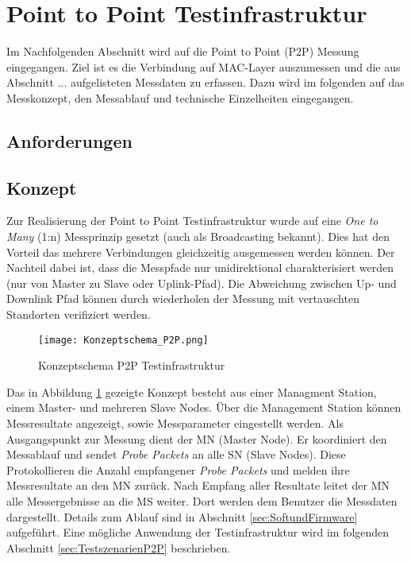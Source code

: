 \clearpage
\section{Point to Point Testinfrastruktur}\label{sec:PointtoPointTestinfrastruktur}

Im Nachfolgenden Abschnitt wird auf die Point to Point (P2P) Messung eingegangen. Ziel ist es die Verbindung auf MAC-Layer auszumessen und die aus Abschnitt ... aufgelisteten Messdaten zu erfassen. Dazu wird im folgenden auf das Messkonzept, den Messablauf und technische Einzelheiten eingegangen. 

\subsection{Anforderungen}\label{sec:AnforderungentP2P}


\subsection{Konzept}\label{sec:KonzeptP2P}

Zur Realisierung der Point to Point Testinfrastruktur wurde auf eine \textit{One to Many} (1:n) Messprinzip gesetzt (auch als Broadcasting bekannt). Dies hat den Vorteil das mehrere Verbindungen gleichzeitig ausgemessen werden können. Der Nachteil dabei ist, dass die Messpfade nur unidirektional charakterisiert werden (nur von Master zu Slave oder Uplink-Pfad). Die Abweichung zwischen Up- und Downlink Pfad können durch wiederholen der Messung mit vertauschten Standorten verifiziert werden. 

\begin{figure} [H]
	\centering
	\texttt{[image: Konzeptschema\_P2P.png]}
	\caption{Konzeptschema P2P Testinfrastruktur}
	\label{fig:KonzeptschemaP2P}
\end{figure}

Das in Abbildung \ref{fig:KonzeptschemaP2P} gezeigte Konzept besteht aus einer Managment Station, einem Master- und mehreren Slave Nodes. Über die Management Station können Messresultate angezeigt, sowie Messparameter eingestellt werden. Als Ausgangspunkt zur Messung dient der MN (Master Node). Er koordiniert den Messablauf und sendet \textit{Probe Packets} an alle SN (Slave Nodes). Diese Protokollieren die Anzahl empfangener \textit{Probe Packets} und melden ihre Messresultate an den MN zurück. Nach Empfang aller Resultate leitet der MN alle Messergebnisse an die MS weiter. Dort werden dem Benutzer die Messdaten dargestellt. Details zum Ablauf sind in Abschnitt \ref{sec:SoftundFirmware} aufgeführt. Eine mögliche Anwendung der Testinfrastruktur wird im folgenden Abschnitt \ref{sec:TestszenarienP2P} beschrieben.  

